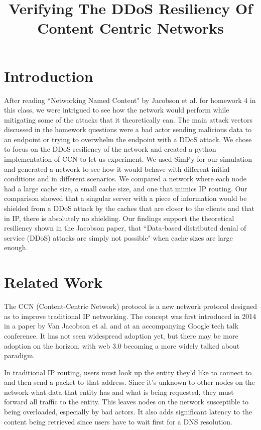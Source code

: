 \documentclass[conference,compsoc, 10pt]{IEEEtran}
\begin{document}
\title{Verifying The DDoS Resiliency Of Content Centric Networks}


\author{}

\maketitle



\section{Introduction}

After reading ``Networking Named Content" \cite{jacobson} by Jacobson et al. for homework 4 in this class, we were intrigued to see how the network would perform while mitigating some of the attacks that it theoretically can. The main attack vectors discussed in the homework questions were a bad actor sending malicious data to an endpoint or trying to overwhelm the endpoint with a DDoS attack. We chose to focus on the DDoS resiliency of the network and created a python implementation of CCN to let us experiment. We used SimPy \cite{SimPy} for our simulation and generated a network to see how it would behave with different initial conditions and in different scenarios. We compared a network where each node had a large cache size, a small cache size, and one that mimics IP routing. Our comparison showed that a singular server with a piece of information would be shielded from a DDoS attack by the caches that are closer to the clients and that in IP, there is absolutely no shielding. Our findings support the theoretical resiliency shown in the Jacobson paper, that ``Data-based distributed denial of service (DDoS) attacks are simply not possible" when cache sizes are large enough.


\section{Related Work}
The CCN (Content-Centric Network) protocol is a new network protocol designed as to improve traditional IP networking. The concept was first introduced in 2014 in a paper by Van Jacobson et al. \cite{jacobson} and at an accompanying Google tech talk conference. It has not seen widespread adoption yet, but there may be more adoption on the horizon, with web 3.0 becoming a more widely talked about paradigm.

In traditional IP routing, users must look up the entity they'd like to connect to and then send a packet to that address. Since it's unknown to other nodes on the network what data that entity has and what is being requested, they must forward all traffic to the entity. This leaves nodes on the network susceptible to being overloaded, especially by bad actors. It also adds significant latency to the content being retrieved since users have to wait first for a DNS resolution.
\end{document}
